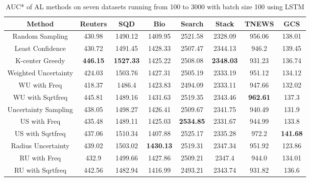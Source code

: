 \begin{table}[th]
	\centering
	\scriptsize
	\begin{tabular}{cccccccc}
		\toprule
		Method & Reuters & SQD & Bio & Search & Stack & TNEWS & GCS \\ \hline
		Random Sampling & 430.98 & 1490.12 & 1409.95 & 2521.58 & 2328.09 & 956.06 & 138.01\\
		Least Confidence & 430.72 & 1491.45 & 1428.33 & 2507.47 & 2344.13 & 946.2 & 139.45\\
		K-center Greedy & \textbf{446.15} & \textbf{1527.33} & 1425.22 & 2508.08 & \textbf{2348.03} & 931.23 & 136.74\\ \hline
		Weighted Uncertainty & 424.03 &  1503.76 & 1427.31 & 2505.19 & 2333.19 & 951.12 & 134.12\\
		WU with Freq & 418.37 & 1486.4 & 1423.83 & 2494.09 & 2333.11 & 947.66 & 132.02\\
		WU with Sqrtfreq & 445.81 & 1489.16 & 1431.63 & 2519.35 & 2343.46 & \textbf{962.61} & 137.3\\ \hline
		Uncertainty Sampling & 438.05 & 1498.27 & 1426.41 & 2509.67 & 2341.75 & 940.49 & 131.9\\
		US with Freq & 435.48 & 1489.11 & 1425.03 & \textbf{2534.85} & 2331.67 & 944.99 & 133.8\\
		US with Sqrtfreq & 437.06 & 1510.34 & 1407.88 & 2525.17 & 2335.28 & 972.2 & \textbf{141.68}\\ \hline
		Radius Uncertainty & 439.02 & 1503.02 & \textbf{1430.13} & 2519.31 & 2347.34 & 951.92 & 123.86\\
		RU with Freq & 432.9 & 1499.66 & 1427.86 & 2509.21 & 2347.4 & 944.0 & 134.01\\
		RU with Sqrtfreq & 442.56 & 1482.94 & 1416.99 & 2493.21 & 2343.74 & 931.82 & 136.6\\
		\hline
	\end{tabular}
\caption{AUC* of AL methods on seven datasets running from 100 to 3000 with batch size 100 using LSTM}
\label{table:auc_lstm}
\end{table}

